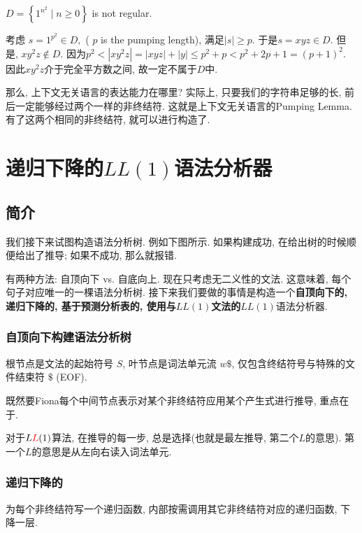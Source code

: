 \documentclass{ctexart}
\begin{document}
\begin{example}
    $D=\left\{1^{n^2} \mid n \geq 0\right\}$ is not regular.

    考虑 $s=1^{p^2}\in D, $ ( $p$ is the pumping length), 满足$|s| \geq p$. 于是$s=x y z\in D$. 但是, $x y^2 z \notin D$. 因为$p^2<\left|x y^2 z\right|=|x y z|+|y| \leq p^2+p<p^2+2 p+1=(p+1)^2$. 因此$x y^2 z$介于完全平方数之间, 故一定不属于$D$中. 
\end{example}

那么, 上下文无关语言的表达能力在哪里? 实际上, 只要我们的字符串足够的长, 前后一定能够经过两个一样的非终结符. 这就是上下文无关语言的Pumping Lemma. 有了这两个相同的非终结符, 就可以进行构造了. 


\section{递归下降的$LL(1)$语法分析器} 

\subsection{简介}

我们接下来试图构造语法分析树. 例如下图所示. 如果构建成功, 在给出树的时候顺便给出了推导; 如果不成功, 那么就报错. 


有两种方法: 自顶向下 vs. 自底向上. 现在只考虑无二义性的文法. 这意味着, 每个句子对应唯一的一棵语法分析树. 接下来我们要做的事情是构造一个\textbf{自顶向下的, 递归下降的, 基于预测分析表的, 使用与$LL(1)$文法的}$LL(1)$语法分析器. 

\subsubsection{自顶向下构建语法分析树} 根节点是文法的起始符号 $S$, 叶节点是词法单元流 $w \$$, 仅包含终结符号与特殊的文件结束符 $\$$ (EOF).
        

既然要Fiona每个中间节点表示对某个非终结符应用某个产生式进行推导, 重点在于. 

对于$L{{\color{red}L}}(1)$算法, 在推导的每一步, 总是选择(也就是最左推导, 第二个$L$的意思). 第一个$L$的意思是从左向右读入词法单元. 

\subsubsection{递归下降的} 为每个非终结符写一个递归函数, 内部按需调用其它非终结符对应的递归函数, 下降一层. 
\end{document}

